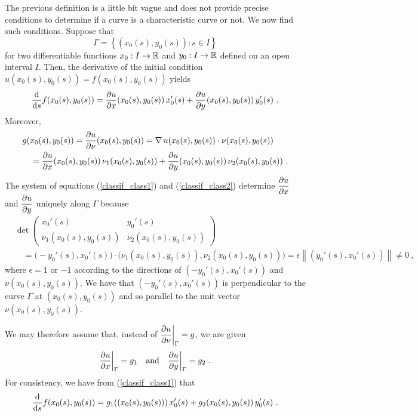 The previous definition is a little bit vague and does not provide precise
conditions to determine if a curve is a characteristic curve or not.
We now find such conditions.  Suppose that
\begin{equation} \label{classif_GammaEq1}
\Gamma = \left\{ (x_0(s), y_0(s)) : s \in I \right\}
\end{equation}
for two differentiable functions $x_0:I\rightarrow \RR$ and
$y_0:I\rightarrow \RR$ defined on an open interval $I$.
Then, the derivative of the initial condition
$u(x_0(s),y_0(s)) = f(x_0(s),y_0(s))$ yields
\begin{equation} \label{classif_class1}
\dfdx{f(x_0(s),y_0(s))}{s} =
\pdydx{u}{x}(x_0(s),y_0(s))\,x_0'(s) + \pdydx{u}{y}(x_0(s),y_0(s))\,
y_0'(s) \ .
\end{equation}
Moreover,
\begin{align}
&g(x_0(s),y_0(s)) = \pdydx{u}{\nu}(x_0(s),y_0(s))
= \graD u(x_0(s),y_0(s)) \cdot
\nu(x_0(s),y_0(s)) \nonumber \\
&\quad = \pdydx{u}{x}(x_0(s),y_0(s))\,\nu_1(x_0(s),y_0(s)) +
\pdydx{u}{y}(x_0(s),y_0(s))\,\nu_2(x_0(s),y_0(s)) \ .
\label{classif_class2}
\end{align}
The system of equations (\ref{classif_class1}) and
(\ref{classif_class2}) determine $\DS \pdydx{u}{x}$ and 
$\DS \pdydx{u}{y}$ uniquely along $\Gamma$ because
\begin{align*}
&\det
\begin{pmatrix}
x_0'(s) & y_0'(s) \\
\nu_1(x_0(s),y_0(s)) & \nu_2(x_0(s),y_0(s))
\end{pmatrix} \\
&\quad = \big(-y_0'(s),x_0'(s)\big)\cdot \big(\nu_1(x_0(s),y_0(s)),
\nu_2(x_0(s),y_0(s))\big) = \epsilon \left\|(y_0'(s),x_0'(s))\right\|
\neq  0  \ ,
\end{align*}
where $\epsilon = 1$ or $-1$ according to the directions of
$(-y_0'(s),x_0'(s))$ and $\nu(x_0(s),y_0(s))$.  We have that
$(-y_0'(s),x_0'(s))$ is perpendicular to the curve $\Gamma$ at
$(x_0(s),y_0(s))$ and so parallel to the unit vector
$\nu(x_0(s),y_0(s))$.

We may therefore assume that, instead of
$\DS \pdydx{u}{\nu}\bigg|_\Gamma = g$, we are given
\begin{equation} \label{classif_class3}
\pdydx{u}{x}\bigg|_\Gamma = g_1 \quad \text{and} \quad 
\pdydx{u}{y}\bigg|_\Gamma = g_2 \ .
\end{equation}
For consistency, we have from (\ref{classif_class1}) that
\[
\dfdx{f(x_0(s),y_0(s))}{s} =
g_1((x_0(s),y_0(s)))\,x_0'(s) + g_2(x_0(s),y_0(s))\, y_0'(s) \ .
\]

